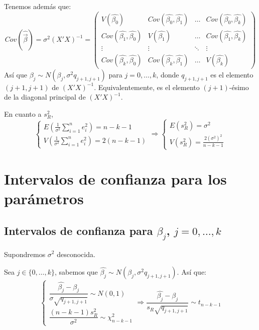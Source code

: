 \documentclass{report}
\theoremstyle{remark}
\theoremstyle{remark}
\theoremstyle{remark}
\theoremstyle{definition}
\theoremstyle{definition}
\theoremstyle{definition}
\begin{document}
Tenemos además que:
$$Cov(\hat{\vec{\beta}}) = \sigma^2(X'X)^{-1} = \begin{pmatrix}
        V(\hat{\beta_0})                  & Cov(\hat{\beta_0}, \hat{\beta_1}) & \dots  & Cov(\hat{\beta_0}, \hat{\beta_k}) \\
        Cov(\hat{\beta_1}, \hat{\beta_0}) & V(\hat{\beta_1})                  & \dots  & Cov(\hat{\beta_1}, \hat{\beta_k}) \\
        \vdots                            & \vdots                            & \ddots & \vdots                            \\
        Cov(\hat{\beta_k}, \hat{\beta_0}) & Cov(\hat{\beta_k}, \hat{\beta_1}) & \dots  & V(\hat{\beta_k})
    \end{pmatrix}$$
Así que $\hat{\beta_j} \sim N(\beta_j, \sigma^2 q_{j+1, j+1})$ para $j = 0, \dots, k$, donde $q_{j+1, j+1}$ es el elemento $(j+1, j+1)$ de $(X'X)^{-1}$.
Equivalentemente, es el elemento $(j+1)$-ésimo de la diagonal principal de $(X'X)^{-1}$.

En cuanto a $s_R^2$,
$$\begin{cases}
        E(\frac{1}{\sigma^2} \sum_{i=1}^n e_i^2) = n-k-1 \\
        V(\frac{1}{\sigma^2} \sum_{i=1}^n e_i^2) = 2(n-k-1)
    \end{cases} \Rightarrow \begin{cases}
        E(s_R^2) = \sigma^2 \\
        V(s_R^2) = \frac{2(\sigma^2)^2}{n-k-1}
    \end{cases}$$

\section{Intervalos de confianza para los parámetros}
\subsection*{Intervalos de confianza para $\beta_j$, $j = 0, \dots, k$}
Supondremos $\sigma^2$ desconocida.

Sea $j \in \{0, \dots, k\}$, sabemos que $\hat{\beta_j} \sim N(\beta_j, \sigma^2 q_{j+1, j+1})$.
Así que:
$$\begin{cases}
        \dfrac{\hat{\beta_j} - \beta_j}{\sigma \sqrt{q_{j+1, j+1}}} \sim N(0, 1) \\
        \dfrac{(n-k-1)s_R^2}{\sigma^2} \sim \chi^2_{n-k-1}
    \end{cases} \Rightarrow \frac{\hat{\beta_j} - \beta_j}{s_R \sqrt{q_{j+1, j+1}}} \sim t_{n-k-1}$$
\end{document}
